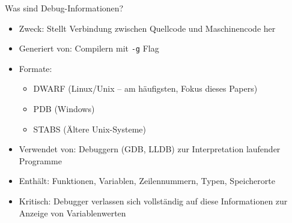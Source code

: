 ﻿\documentclass{beamer}
\begin{document}
\begin{frame}{Was sind Debug-Informationen?}
  \begin{itemize}
    \item Zweck: Stellt Verbindung zwischen Quellcode und Maschinencode her
    \item Generiert von: Compilern mit \texttt{-g} Flag
    \item Formate:
      \begin{itemize}
        \item DWARF (Linux/Unix -- am h\"aufigsten, Fokus dieses Papers)
        \item PDB (Windows)
        \item STABS (\"Altere Unix-Systeme)
      \end{itemize}
    \item Verwendet von: Debuggern (GDB, LLDB) zur Interpretation laufender Programme
    \item Enth\"alt: Funktionen, Variablen, Zeilennummern, Typen, Speicherorte
    \item Kritisch: Debugger verlassen sich vollst\"andig auf diese Informationen zur Anzeige von Variablenwerten
  \end{itemize}
\end{frame}
\end{document}
